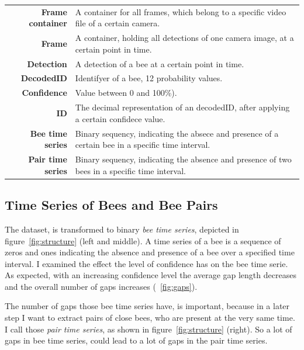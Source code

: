  
\begin{table}[!b]
\colorbox{usethiscolorhere}{
\centering
\begin{tabularx}{\textwidth}{@{} r Y @{}}
	\textbf{Frame container} &
	A container for all frames,
	which belong to a specific
	video file of a certain camera.\\
	\textbf{Frame} &
	A container, holding all detections
	of one camera image, at a certain
	point in time.\\
	\textbf{Detection} & A detection of a bee
	at a certain point in time.\\
	\textbf{DecodedID} & Identifyer of a bee,
	12 probability values.\\
	\textbf{Confidence} &
	Value between 0 and 100\%).\\
	\textbf{ID} &
	The decimal representation of
	an decodedID, after applying
	a certain confidece value.\\
	\textbf{Bee time series} &
	Binary sequency, indicating the
	absece and presence of a certain
	bee in a specific time interval.\\
	\textbf{Pair time series} &
	Binary sequency, indicating the
	absence and presence of two
	bees in a specific time interval.\\
\end{tabularx}
}
\end{table}

\subsection{Time Series of Bees and Bee Pairs}
\label{subsec:tracking}

The dataset, is transformed to binary \emph{bee time series}, depicted in figure~\ref{fig:structure} (left and middle). A time series of a bee is a sequence of zeros and ones indicating the absence and presence of a bee over a specified time interval. 
I examined the effect the level of confidence has on the bee time serie.
As expected, with an increasing confidence level the average gap length decreases and the overall number of gaps increases (~\ref{fig:gaps}).

The number of gaps those bee time series have, is important, because in a later step I want to extract pairs of close bees, who are present at the very same time. I call those \emph{pair time series}, as shown in figure~\ref{fig:structure} (right). So a lot of gaps in bee time series, could lead to a lot of gaps in the pair time series.

